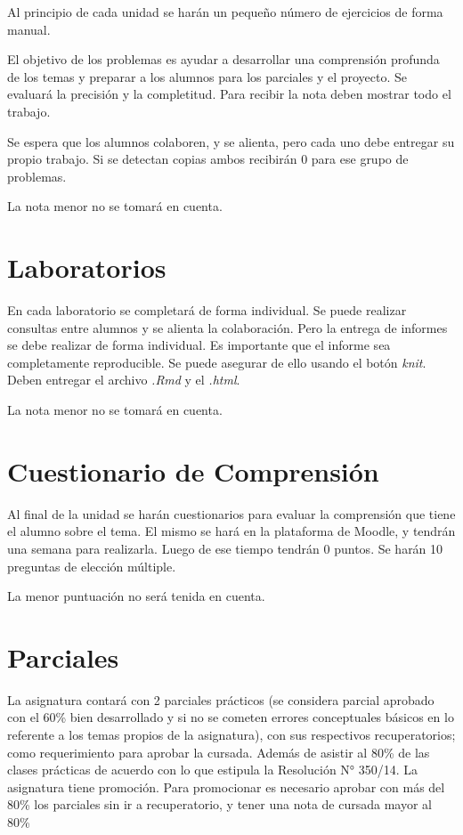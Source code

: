 \documentclass[]{book}
\theoremstyle{definition}
\theoremstyle{definition}
\theoremstyle{definition}
\theoremstyle{remark}
\begin{document}
Al principio de cada unidad se harán un pequeño número de ejercicios de
forma manual.

El objetivo de los problemas es ayudar a desarrollar una comprensión
profunda de los temas y preparar a los alumnos para los parciales y el
proyecto. Se evaluará la precisión y la completitud. Para recibir la
nota deben mostrar todo el trabajo.

Se espera que los alumnos colaboren, y se alienta, pero cada uno debe
entregar su propio trabajo. Si se detectan copias ambos recibirán 0 para
ese grupo de problemas.

La nota menor no se tomará en cuenta.

\hypertarget{laboratorios}{%
\section{Laboratorios}\label{laboratorios}}

En cada laboratorio se completará de forma individual. Se puede realizar
consultas entre alumnos y se alienta la colaboración. Pero la entrega de
informes se debe realizar de forma individual. Es importante que el
informe sea completamente reproducible. Se puede asegurar de ello usando
el botón \emph{knit}. Deben entregar el archivo \emph{.Rmd} y el
\emph{.html}.

La nota menor no se tomará en cuenta.

\hypertarget{cuestionario-de-comprension}{%
\section{Cuestionario de
Comprensión}\label{cuestionario-de-comprension}}

Al final de la unidad se harán cuestionarios para evaluar la comprensión
que tiene el alumno sobre el tema. El mismo se hará en la plataforma de
Moodle, y tendrán una semana para realizarla. Luego de ese tiempo
tendrán 0 puntos. Se harán 10 preguntas de elección múltiple.

La menor puntuación no será tenida en cuenta.

\hypertarget{parciales}{%
\section{Parciales}\label{parciales}}

La asignatura contará con 2 parciales prácticos (se considera parcial
aprobado con el 60\% bien desarrollado y si no se cometen errores
conceptuales básicos en lo referente a los temas propios de la
asignatura), con sus respectivos recuperatorios; como requerimiento para
aprobar la cursada. Además de asistir al 80\% de las clases prácticas de
acuerdo con lo que estipula la Resolución N° 350/14. La asignatura tiene
promoción. Para promocionar es necesario aprobar con más del 80\% los
parciales sin ir a recuperatorio, y tener una nota de cursada mayor al
80\%
\end{document}
